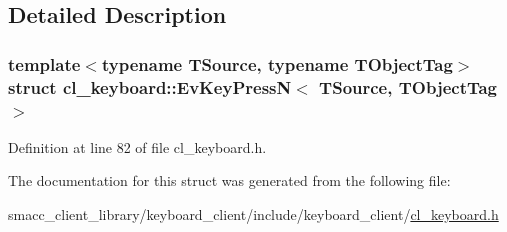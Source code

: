 \subsection{Detailed Description}
\subsubsection*{template$<$typename T\+Source, typename T\+Object\+Tag$>$\newline
struct cl\+\_\+keyboard\+::\+Ev\+Key\+Press\+N$<$ T\+Source, T\+Object\+Tag $>$}



Definition at line 82 of file cl\+\_\+keyboard.\+h.



The documentation for this struct was generated from the following file\+:\begin{DoxyCompactItemize}
\item 
smacc\+\_\+client\+\_\+library/keyboard\+\_\+client/include/keyboard\+\_\+client/\hyperlink{cl__keyboard_8h}{cl\+\_\+keyboard.\+h}\end{DoxyCompactItemize}
